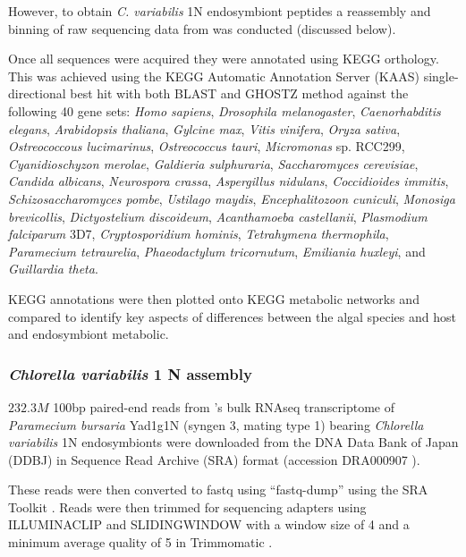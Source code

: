 However, to obtain \textit{C. variabilis} 1N endosymbiont peptides 
a reassembly and binning of raw sequencing data from \citep{Kodama2014}
was conducted (discussed below). 

Once all sequences were acquired they were annotated using KEGG
orthology.  This was achieved 
using the KEGG Automatic Annotation Server (KAAS) \citep{Moriya2007a}
single-directional best hit with both BLAST and GHOSTZ \citep{Suzuki2014,Suzuki2015} 
method against the following 40 gene sets: \textit{Homo sapiens}, 
\textit{Drosophila melanogaster}, \textit{Caenorhabditis elegans},
\textit{Arabidopsis thaliana}, \textit{Gylcine max},
\textit{Vitis vinifera}, \textit{Oryza sativa}, 
\textit{Ostreococcous lucimarinus}, \textit{Ostreococcus tauri},
\textit{Micromonas} sp. RCC299, \textit{Cyanidioschyzon merolae},
\textit{Galdieria sulphuraria}, \textit{Saccharomyces cerevisiae},
\textit{Candida albicans}, \textit{Neurospora crassa}, \textit{Aspergillus nidulans},
\textit{Coccidioides immitis}, \textit{Schizosaccharomyces pombe},
\textit{Ustilago maydis}, \textit{Encephalitozoon cuniculi},
\textit{Monosiga brevicollis}, \textit{Dictyostelium discoideum}, 
\textit{Acanthamoeba castellanii}, \textit{Plasmodium falciparum} 3D7, 
\textit{Cryptosporidium hominis}, \textit{Tetrahymena thermophila},
\textit{Paramecium tetraurelia}, \textit{Phaeodactylum tricornutum},
\textit{Emiliania huxleyi}, and \textit{Guillardia theta}.

KEGG annotations were then plotted onto KEGG metabolic networks and compared 
to identify key aspects of differences between the algal species and
host and endosymbiont metabolic.

\subsubsection{\textit{Chlorella variabilis} 1 N assembly}
\(232.3M\) 100bp paired-end reads from \citep{Kodama2014}'s 
bulk RNAseq transcriptome of \textit{Paramecium bursaria} Yad1g1N (syngen
3, mating type 1) bearing \textit{Chlorella variabilis} 1N endosymbionts
were downloaded from the DNA Data Bank of Japan (DDBJ) \citep{Tateno2002,Kaminuma2011}
in Sequence Read Archive (SRA) format \citep{Leinonen2011,KodamaNRA2012b} (accession DRA000907 \citep{Kodama2014}).

These reads were then converted to fastq using ``fastq-dump'' using the SRA Toolkit
\citep{NationalCenterforBiotechnologyInformation2011}.  Reads were then trimmed
for sequencing adapters using ILLUMINACLIP and SLIDINGWINDOW with a window size
of 4 and a minimum average quality of 5 in Trimmomatic \citep{Bolger2014a}.


